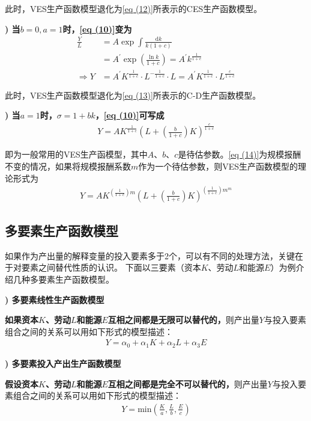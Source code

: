 	此时，VES生产函数模型退化为\eqref{eq (12)}所表示的CES生产函数模型。
		
{\bf {}) 当$ b=0, a=1 $时，\eqref{eq (10)}变为}
	\begin{align}
		\frac{Y}{L} & = A \exp \int \frac{\mathrm{d}k}{k(1+c)} \nonumber \\
		& = A^{\prime} \exp \left(\frac{\ln k}{1+c}\right)=A^{\prime} k^{\frac{1}{1+c}} \nonumber \\
		\Rightarrow Y & = A^{\prime} K^{\frac{1}{1+c}} \cdot L^{-\frac{1}{1+c}} \cdot L=A^{\prime} K^{\frac{1}{1+c}} \cdot L^{\frac{c}{1+c}} \label{eq (13)}
	\end{align}
	 
	此时，VES生产函数模型退化为\eqref{eq (13)}所表示的C-D生产函数模型。
		
{\bf {}) 当$ a=1 $时，$ \sigma=1+b k $，\eqref{eq (10)}可写成}
	\begin{align}
		Y=A K^{\frac{1}{1+c}}\left(L+\left(\frac{b}{1+c}\right) K\right)^{\frac{c}{1+c}} \label{eq (14)}
	\end{align}

	即为一般常用的VES生产函模型，其中$ A $、$ b $、$ c $是待估参数。\eqref{eq (14)}为规模报酬不变的情况，如果将规模报酬系数$ m $作为一个待估参数，则VES生产函数模型的理论形式为
	\begin{align}
		Y=A K^{\left(\frac{1}{1+c}\right) m}\left(L+\left(\frac{b}{1+c}\right) K\right)^{\left(\frac{1}{1+c}\right) m^{m}} \label{eq (15)}
	\end{align}

\subsection{多要素生产函数模型}
	
如果作为产出量的解释变量的投入要素多于2个，可以有不同的处理方法，关键在于对要素之间替代性质的认识。
下面以三要素（资本$ K $、劳动$ L $和能源$ E $）为例介绍几种多要素生产函数模型。 
	
{\bf {}) 多要素线性生产函数模型}
	
	\textbf{如果资本$ K $、劳动$ L $和能源$ E $互相之间都是无限可以替代的，}则产出量$ Y $与投入要素组合之间的关系可以用如下形式的模型描述：
	\begin{align}
		Y = \alpha_{0}+\alpha_{1}K+\alpha_{2}L+\alpha_{3}E
	\end{align}
		
{\bf {}) 多要素投入产出生产函数模型}
		
	\textbf{假设资本$ K $、劳动$ L $和能源$ E $互相之间都是完全不可以替代的，}则产出量$ Y $与投入要素组合之间的关系可以用如下形式的模型描述：
	\begin{align}
		Y = \text{min}\left ( \frac{K}{a},\frac{L}{b},\frac{E}{c} \right ) 
	\end{align}
		
